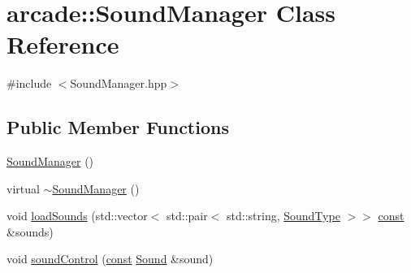 \hypertarget{classarcade_1_1_sound_manager}{\section{arcade\-:\-:Sound\-Manager Class Reference}
\label{classarcade_1_1_sound_manager}
}


{\ttfamily \#include $<$Sound\-Manager.\-hpp$>$}

\subsection*{Public Member Functions}
\begin{DoxyCompactItemize}
\item 
\hyperlink{classarcade_1_1_sound_manager_a0b4e3bd1cd116bf5325527f792f7e108}{Sound\-Manager} ()
\item 
virtual \hyperlink{classarcade_1_1_sound_manager_a1591367447f85a791fc7a83dadc32850}{$\sim$\-Sound\-Manager} ()
\item 
void \hyperlink{classarcade_1_1_sound_manager_a1cbbe40bcba6512fecf372ff6e39de1f}{load\-Sounds} (std\-::vector$<$ std\-::pair$<$ std\-::string, \hyperlink{namespacearcade_a3bb4743a2eea59f3927e404e6549cae5}{Sound\-Type} $>$$>$ \hyperlink{term__entry_8h_a57bd63ce7f9a353488880e3de6692d5a}{const} \&sounds)
\item 
void \hyperlink{classarcade_1_1_sound_manager_a41ee1e69e82e9cc9f9a47be3dbda0483}{sound\-Control} (\hyperlink{term__entry_8h_a57bd63ce7f9a353488880e3de6692d5a}{const} \hyperlink{structarcade_1_1_sound}{Sound} \&sound)
\end{DoxyCompactItemize}


